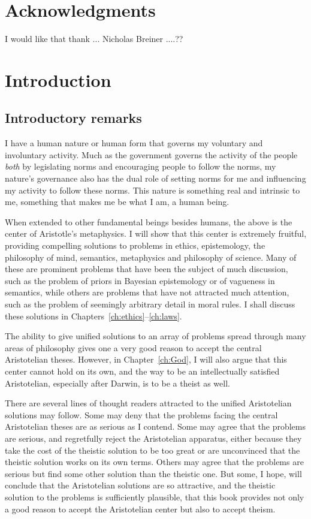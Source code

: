 \def\mychapter{I}

\chapter*{Acknowledgments}
I would like that thank ... Nicholas Breiner ....??
\chapter{Introduction}\label{ch:intro}
\section{Introductory remarks}
I have a human nature or human form that governs my voluntary and involuntary activity.
Much as the government governs the activity of the people \textit{both} by legislating norms and encouraging
people to follow the norms, my nature's governance also has the dual role of setting norms for me and influencing my
activity to follow these norms. This nature is something real and intrinsic to me, something that makes me be what I am, 
a human being. 

When extended to other fundamental beings besides humans, the above is the center of Aristotle's metaphysics.
I will show that this center is extremely fruitful, providing compelling solutions to problems in ethics,
epistemology, the philosophy of mind, semantics, metaphysics and philosophy of science. Many of these are prominent problems that have been
the subject of much discussion, such as the problem of priors in Bayesian epistemology or of vagueness in semantics, while others 
are problems
that have not attracted much attention, such as the problem of seemingly arbitrary detail in moral rules. 
I shall discuss these solutions in Chapters~\ref{ch:ethics}--\ref{ch:laws}.

The ability to give unified solutions to an array of problems spread through many areas of philosophy gives one
a very good reason to accept the central Aristotelian theses. However, in Chapter~\ref{ch:God}, I will also argue that this center cannot 
hold on its own, and the way to be an intellectually satisfied Aristotelian, especially after Darwin, is to be a theist 
as well.

There are several lines of thought readers attracted to the unified Aristotelian solutions may  follow. Some
may deny that the problems facing the central Aristotelian theses are as serious as I contend. Some may agree that
the problems are serious, and regretfully reject the Aristotelian apparatus, either because they take the cost of 
the theistic solution to be too great or are unconvinced that the theistic solution works on its own terms. 
Others may agree that the problems are serious but find some other solution than the theistic one. But some, I hope, 
will conclude that the Aristotelian solutions are so attractive, and the theistic solution to the problems is sufficiently 
plausible, that this book provides not only a good reason to accept the Aristotelian center but also to accept
theism.

